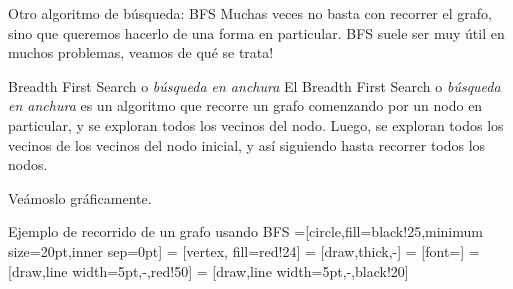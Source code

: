 \documentclass[compress]{beamer}
\begin{document}
\begin{frame}{Otro algoritmo de búsqueda: BFS}
Muchas veces no basta con recorrer el grafo, sino que queremos hacerlo de una forma en particular. BFS suele ser muy útil en muchos problemas, veamos de qué se trata!
\bigskip

\begin{block}{Breadth First Search o \textit{búsqueda en anchura}}
El Breadth First Search o \textit{búsqueda en anchura} es un algoritmo que recorre un grafo comenzando por un nodo en particular, y se exploran todos los vecinos del nodo. Luego, se exploran todos los vecinos de los vecinos del nodo inicial, y así siguiendo hasta recorrer todos los nodos.
\end{block}

Veámoslo gráficamente.
\end{frame}

\begin{frame}{Ejemplo de recorrido de un grafo usando BFS}
=[circle,fill=black!25,minimum size=20pt,inner sep=0pt]
 = [vertex, fill=red!24]
 = [draw,thick,-]
 = [font=\small]
 = [draw,line width=5pt,-,red!50]
 = [draw,line width=5pt,-,black!20]

\begin{figure}
\end{figure}
\end{frame}
\end{document}
